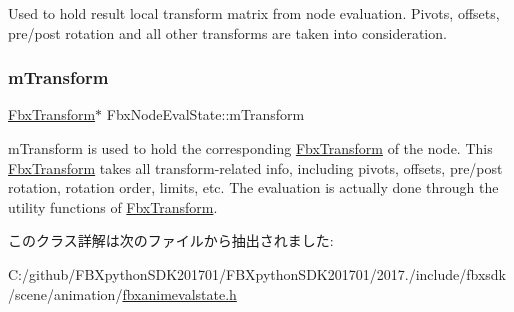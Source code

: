 Used to hold result local transform matrix from node evaluation. Pivots, offsets, pre/post rotation and all other transforms are taken into consideration. 

\mbox{\label{class_fbx_node_eval_state_a49ac9e098c85b1642bb7f78d90c756ac}} 
\subsubsection{\texorpdfstring{m\+Transform}{mTransform}}
{\footnotesize\ttfamily \hyperlink{class_fbx_transform}{Fbx\+Transform}$\ast$ Fbx\+Node\+Eval\+State\+::m\+Transform}

m\+Transform is used to hold the corresponding \hyperlink{class_fbx_transform}{Fbx\+Transform} of the node. This \hyperlink{class_fbx_transform}{Fbx\+Transform} takes all transform-\/related info, including pivots, offsets, pre/post rotation, rotation order, limits, etc. The evaluation is actually done through the utility functions of \hyperlink{class_fbx_transform}{Fbx\+Transform}. 

このクラス詳解は次のファイルから抽出されました\+:\begin{DoxyCompactItemize}
\item 
C\+:/github/\+F\+B\+Xpython\+S\+D\+K201701/\+F\+B\+Xpython\+S\+D\+K201701/2017./include/fbxsdk/scene/animation/\hyperlink{fbxanimevalstate_8h}{fbxanimevalstate.\+h}\end{DoxyCompactItemize}
